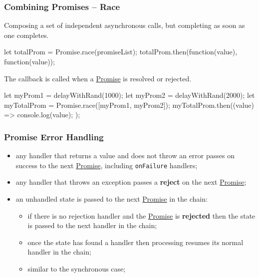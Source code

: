 \subsubsection{Combining Promises -- Race}\label{sub:rs_combining_promises_race} %
Composing a set of independent asynchronous calls, but completing as soon as one completes.
\begin{codeblock}[js]{}
    let totalProm = Promise.race(promiseList);
    totalProm.then(function(value){},
    function(value){});
\end{codeblock}
The callback is called when a \hyperref[def:promises]{Promise} is resolved or rejected.
\begin{example}{}{}
    \begin{codeblock}[js]{}
    let myProm1 = delayWithRand(1000);
    let myProm2 = delayWithRand(2000);
    let myTotalProm = Promise.race([myProm1, myProm2]);
    myTotalProm.then((value) => {
        console.log(value);
    });
    \end{codeblock}
\end{example}
%
\subsubsection{Promise Error Handling}\label{sub:rs_promise_error_handling} %
\begin{note}[Rules]
    \begin{itemize}
        \item any handler that returns a value and does not throw an error passes on success to the next \hyperref[def:promises]{Promise}, including \texttt{onFailure} handlers;
        \item any handler that throws an exception passes a \textbf{reject} on the next \hyperref[def:promises]{Promise};
        \item an unhandled state is passed to the next \hyperref[def:promises]{Promise} in the chain:
            \begin{itemize}
                \item if there is no rejection handler and the \hyperref[def:promises]{Promise} is \textbf{rejected} then the state is passed to the next handler in the chain;
                \item once the state has found a handler then processing resumes its normal handler in the chain;
                \item similar to the synchronous case;
            \end{itemize}
    \end{itemize}
\end{note}
%
